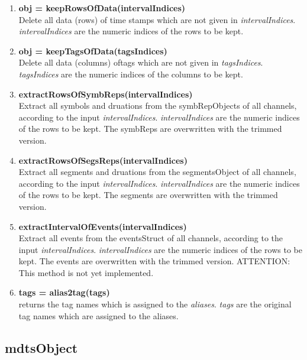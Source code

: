 \documentclass[a4]{scrreprt}
\begin{document}
\begin{enumerate}
	
	\item \textbf{obj = keepRowsOfData(intervalIndices)}\\
	Delete all data (rows) of time stamps which are not given in \textit{intervalIndices}. \textit{intervalIndices} are the numeric indices of the rows to be kept.
	
	\item \textbf{obj = keepTagsOfData(tagsIndices)}\\
	Delete all data (columns) oftags which are not given in \textit{tagsIndices}. \textit{tagsIndices} are the numeric indices of the columns to be kept.
	
	\item \textbf{extractRowsOfSymbReps(intervalIndices)}\\
	Extract all symbols and druations from the symbRepObjects of all channels, according to the input \textit{intervalIndices}. \textit{intervalIndices} are the numeric indices of the rows to be kept. The symbReps are overwritten with the trimmed version.
	
	\item \textbf{extractRowsOfSegsReps(intervalIndices)}\\
	Extract all segments and druations from the segmentsObject of all channels, according to the input \textit{intervalIndices}. \textit{intervalIndices} are the numeric indices of the rows to be kept. The segments are overwritten with the trimmed version.
	
	\item \textbf{extractIntervalOfEvents(intervalIndices)}\\
	Extract all events from the eventsStruct of all channels, according to the input \textit{intervalIndices}. \textit{intervalIndices} are the numeric indices of the rows to be kept. The events are overwritten with the trimmed version. ATTENTION: This method is not yet implemented.
	
	\item \textbf{tags = alias2tag(tags)}\\
	returns the tag names which is assigned to the \textit{aliases}. \textit{tags} are the original tag names which are assigned to the aliases.
\end{enumerate}

\subsection{mdtsObject}
\end{document}
